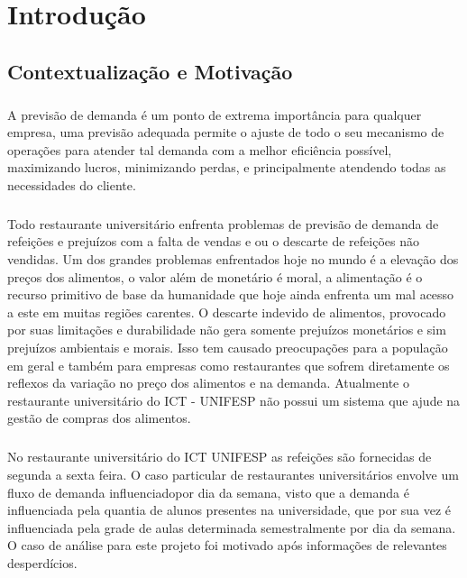\documentclass[	12pt, Times, openright, twoside, a4paper, english, brazil]{abntex2}
\begin{document}
\tableofcontents*
\cleardoublepage

\textual

\chapter{Introdução}
\section{Contextualização e Motivação}

\paragraph*{} A previsão de demanda é um ponto de extrema importância para qualquer empresa, uma previsão adequada permite o ajuste de todo o seu mecanismo de operações para atender tal demanda com a melhor eficiência possível, maximizando lucros, minimizando perdas, e principalmente atendendo todas as necessidades do cliente.

\paragraph*{} Todo restaurante universitário enfrenta problemas de previsão de demanda de refeições e prejuízos com a falta de vendas e ou o descarte de refeições não vendidas. Um dos grandes problemas enfrentados hoje no mundo é a elevação dos preços dos alimentos, o valor além de monetário é moral, a alimentação é o recurso primitivo de base da humanidade que hoje ainda enfrenta um mal acesso a este em muitas regiões carentes. O descarte indevido de alimentos, provocado por suas limitações e durabilidade não gera somente prejuízos monetários e sim prejuízos ambientais e morais. Isso tem causado preocupações para a população em geral e também para empresas como restaurantes que sofrem diretamente os reflexos da variação no preço dos alimentos e na demanda. Atualmente o restaurante universitário do ICT - UNIFESP não possui um sistema que ajude na gestão de compras dos alimentos.

\paragraph*{} No restaurante universitário do ICT UNIFESP as refeições são fornecidas de segunda a sexta feira. O caso particular de restaurantes universitários envolve um fluxo de demanda influenciadopor dia da semana, visto que a demanda é influenciada pela quantia de alunos presentes na universidade, que por sua vez é influenciada pela grade de aulas determinada semestralmente por dia da semana. O caso de análise para este projeto foi motivado após informações de relevantes desperdícios.
\end{document}
